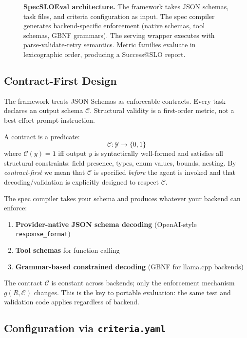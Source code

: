 \documentclass[11pt]{article}
\begin{document}
\begin{figure}[t]
\caption{\textbf{SpecSLOEval architecture.} The framework takes JSON schemas, task files, and criteria configuration as input. The spec compiler generates backend-specific enforcement (native schemas, tool schemas, GBNF grammars). The serving wrapper executes with parse-validate-retry semantics. Metric families evaluate in lexicographic order, producing a Success@SLO report.}
\label{fig:specsloeval-arch}
\end{figure}

\subsection{Contract-First Design}

The framework treats JSON Schemas as enforceable contracts.
Every task declares an output schema $\mathcal{C}$.
Structural validity is a first-order metric, not a best-effort prompt instruction.

A contract is a predicate:
\[
\mathcal{C} : \mathcal{Y} \rightarrow \{0, 1\}
\]
where $\mathcal{C}(y) = 1$ iff output $y$ is syntactically well-formed and satisfies all structural constraints: field presence, types, enum values, bounds, nesting.
By \emph{contract-first} we mean that $\mathcal{C}$ is specified \emph{before} the agent is invoked and that decoding/validation is explicitly designed to respect $\mathcal{C}$.

The spec compiler takes your schema and produces whatever your backend can enforce:
\begin{enumerate}[leftmargin=12pt]
    \item \textbf{Provider-native JSON schema decoding} (OpenAI-style \texttt{response\_format})
    \item \textbf{Tool schemas} for function calling
    \item \textbf{Grammar-based constrained decoding} (GBNF for llama.cpp backends)
\end{enumerate}

The contract $\mathcal{C}$ is constant across backends; only the enforcement mechanism $g(R, \mathcal{C})$ changes.
This is the key to portable evaluation: the same test and validation code applies regardless of backend.

\subsection{Configuration via \texttt{criteria.yaml}}
\end{document}
